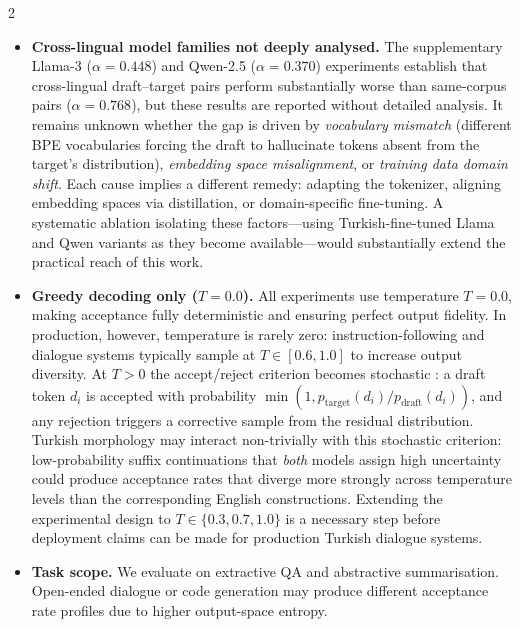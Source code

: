\documentclass[11pt,a4paper]{article}
\begin{document}
\begin{multicols}{2}
\begin{itemize}[leftmargin=*]
  \item \textbf{Cross-lingual model families not deeply analysed.}
        The supplementary Llama-3 ($\alpha=0.448$) and Qwen-2.5
        ($\alpha=0.370$) experiments establish that cross-lingual
        draft--target pairs perform substantially worse than same-corpus
        pairs ($\alpha=0.768$), but these results are reported without
        detailed analysis.
        It remains unknown whether the gap is driven by
        \emph{vocabulary mismatch} (different BPE vocabularies forcing
        the draft to hallucinate tokens absent from the target's
        distribution), \emph{embedding space misalignment}, or
        \emph{training data domain shift}.
        Each cause implies a different remedy: adapting the tokenizer,
        aligning embedding spaces via distillation, or domain-specific
        fine-tuning.
        A systematic ablation isolating these factors—using Turkish-fine-tuned
        Llama and Qwen variants as they become available—would substantially
        extend the practical reach of this work.

  \item \textbf{Greedy decoding only ($T = 0.0$).}
        All experiments use temperature $T=0.0$, making acceptance
        fully deterministic and ensuring perfect output fidelity.
        In production, however, temperature is rarely zero:
        instruction-following and dialogue systems typically sample at
        $T \in [0.6, 1.0]$ to increase output diversity.
        At $T > 0$ the accept/reject criterion becomes stochastic
        \citep{leviathan2023fast}: a draft token $d_i$ is accepted
        with probability $\min(1, p_{\text{target}}(d_i) /
        p_{\text{draft}}(d_i))$, and any rejection triggers a
        corrective sample from the residual distribution.
        Turkish morphology may interact non-trivially with this
        stochastic criterion: low-probability suffix continuations
        that \emph{both} models assign high uncertainty could produce
        acceptance rates that diverge more strongly across temperature
        levels than the corresponding English constructions.
        Extending the experimental design to $T \in \{0.3, 0.7, 1.0\}$
        is a necessary step before deployment claims can be made for
        production Turkish dialogue systems.

  \item \textbf{Task scope.}
        We evaluate on extractive QA and abstractive summarisation.
        Open-ended dialogue or code generation may produce different
        acceptance rate profiles due to higher output-space entropy.


\end{itemize}
\end{multicols}
\end{document}

